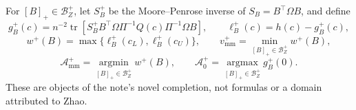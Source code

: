 For \([B]_+\in\mathcal B_Z^+\), let \(S_B^+\) be the Moore--Penrose inverse of \(S_B=B^{\top}\Omega B\), and define
\[
g_B^+(c)=n^{-2}\operatorname{tr}\!\left[S_B^+B^{\top}\Omega\Pi^{-1}Q(c)\Pi^{-1}\Omega B\right],
\qquad \ell_B^+(c)=h(c)-g_B^+(c),
\]
\[
w^+(B)=\max\{\ell_B^+(c_L),\ell_B^+(c_U)\},
\qquad v_{\mathrm{mm}}^+=\min_{[B]_+\in\mathcal B_Z^+}w^+(B),
\]
\[
\mathcal A_{\mathrm{mm}}^+=\operatorname*{argmin}_{[B]_+\in\mathcal B_Z^+}w^+(B),
\qquad \mathcal A_0^+=\operatorname*{argmax}_{[B]_+\in\mathcal B_Z^+}g_B^+(0).
\]
These are objects of the note's novel completion, not formulas or a domain attributed to Zhao.